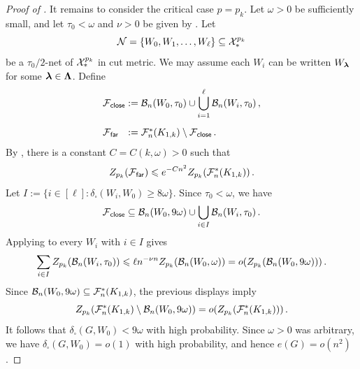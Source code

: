 \begin{proof}[Proof of ]
It remains to consider the critical case $p=p_k$. Let $\omega>0$ be sufficiently small, and let $\tau_0<\omega$ and $\nu>0$ be given by . Let
$${\mathcal N}=\{W_0,W_1,\dots,W_\ell\}\subseteq{\mathcal X}^{p_k}_\ast$$
be a $\tau_0/2$-net of ${\mathcal X}^{p_k}_\ast$ in cut metric. We may assume each $W_i$ can be written $W_{\boldsymbol{\lambda}}$ for some ${\boldsymbol{\lambda}}\in{\boldsymbol{\Lambda}}$. Define
$$\arraycolsep=1.4pt
\begin{array}{ll}
\cF_\close &:= \displaystyle \cB_n(W_0,\tau_0)\cup\bigcup_{i=1}^\ell\cB_n(W_i,\tau_0)\,, \\[18pt]
\cF_\far &:= \cF^\ast_n(K_{1,k})\setminus\cF_\close\,.
\end{array}$$
By , there is a constant $C=C(k,\omega)>0$ such that
$$Z_{p_k}({\mathcal F}_{\hspace{0.2mm}\mathsf{far}})\leqslant e^{-Cn^2}Z_{p_k}({\mathcal F}^\ast_n(K_{1,k}))\,.$$
Let $I:=\{i\in[\ell]:\delta_\square(W_i,W_0)\geq8\omega\}$. Since $\tau_0<\omega$, we have
$${\mathcal F}_{\hspace{0.2mm}\mathsf{close}}\subseteq{\mathcal B}_n(W_0,9\omega)\cup\bigcup_{i\in I}{\mathcal B}_n(W_i,\tau_0)\,.$$
Applying  to every $W_i$ with $i\in I$ gives
$$\sum_{i\in I}Z_{p_k}({\mathcal B}_n(W_i,\tau_0))\leqslant \ell n^{-\nu n}Z_{p_k}({\mathcal B}_n(W_0,\omega))=o(Z_{p_k}({\mathcal B}_n(W_0,9\omega)))\,.$$
Since ${\mathcal B}_n(W_0,9\omega)\subseteq{\mathcal F}^\ast_n(K_{1,k})$, the previous displays imply
$$Z_{p_k}({\mathcal F}^\ast_n(K_{1,k})\setminus{\mathcal B}_n(W_0,9\omega))=o(Z_{p_k}({\mathcal F}^\ast_n(K_{1,k})))\,.$$
It follows that $\delta_\square(G,W_0)<9\omega$ with high probability. Since $\omega>0$ was arbitrary, we have $\delta_\square(G,W_0)=o(1)$ with high probability, and hence $e(G)=o(n^2)$.
\end{proof}

